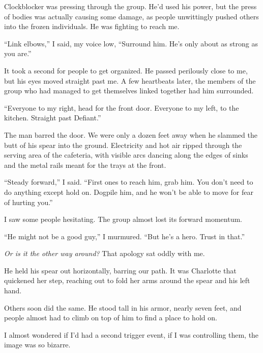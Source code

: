 Clockblocker was pressing through the group.  He'd used his power, but the press of bodies was actually causing some damage, as people unwittingly pushed others into the frozen individuals.  He was fighting to reach me.



``Link elbows,'' I said, my voice low, ``Surround him.  He's only about as strong as you are.''



It took a second for people to get organized.  He passed perilously close to me, but his eyes moved straight past me.  A few heartbeats later, the members of the group who had managed to get themselves linked together had him surrounded.



``Everyone to my right, head for the front door.  Everyone to my left, to the kitchen.  Straight past Defiant.''



The man barred the door.  We were only a dozen feet away when he slammed the butt of his spear into the ground.  Electricity and hot air ripped through the serving area of the cafeteria, with visible arcs dancing along the edges of sinks and the metal rails meant for the trays at the front.



``Steady forward,'' I said.  ``First ones to reach him, grab him.  You don't need to do anything except hold on.  Dogpile him, and he won't be able to move for fear of hurting you.''



I saw some people hesitating.  The group almost lost its forward momentum.



``He might not be a good guy,'' I murmured.  ``But he's a hero.  Trust in that.''



\emph{Or is it the other way around?}  That apology sat oddly with me.



He held his spear out horizontally, barring our path.  It was Charlotte that quickened her step, reaching out to fold her arms around the spear and his left hand.



Others soon did the same.  He stood tall in his armor, nearly seven feet, and people almost had to climb on top of him to find a place to hold on.



I almost wondered if I'd had a second trigger event, if I was controlling them, the image was so bizarre.



